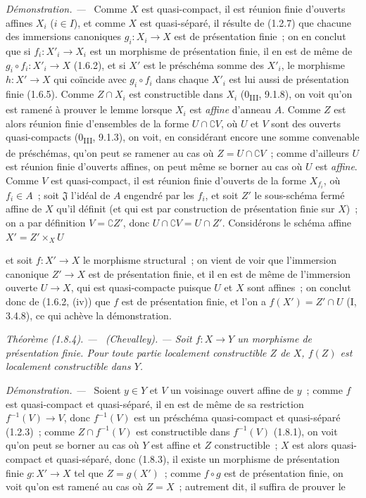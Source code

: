 \documentclass[10pt,oneside]{book}
\makeatletter
\newcommand{\setmanualcurrentlabel}[1]{\def\@currentlabel{#1}}
\newcommand{\oldpage}[2][]{%
  \setcounter{footnote}{0}%
  \marginpar{\scriptsize\textbf{#1}~|~#2}\ignorespaces}
\newenvironment{theorem}[1][]{%
  \setmanualcurrentlabel{#1}\par\medskip\noindent\itshape Théorème (#1). ---\ }{\par}
\newenvironment{proof}{%
  \par\medskip\noindent\textit{Démonstration. ---\ }}{\par}
\makeatother
\begin{document}
\begin{proof}
Comme $X$ est quasi-compact, il est réunion finie d'ouverts affines $X_i$
($i\in I$), et comme $X$ est quasi-séparé, il résulte de (1.2.7) que chacune
des immersions canoniques $g_i:X_i\to X$ est de présentation finie~; on en
conclut que si $f_i:X'_i\to X_i$ est un morphisme de présentation finie, il
en est de même de $g_i\circ f_i:X'_i\to X$ (1.6.2), et si $X'$ est le
préschéma somme des $X'_i$, le morphisme $h:X'\to X$ qui coïncide avec
$g_i\circ f_i$ dans chaque $X'_i$ est lui aussi de présentation finie
(1.6.5). Comme $Z\cap X_i$ est constructible dans $X_i$
(0\textsubscript{III}, 9.1.8), on voit qu'on est ramené à prouver le lemme
lorsque $X_i$ est \emph{affine} d'anneau $A$. Comme $Z$ est alors réunion
finie d'ensembles de la forme $U\cap\complement V$, où $U$ et $V$ sont des
ouverts quasi-compacts (0\textsubscript{III}, 9.1.3), on voit, en considérant
encore une somme convenable de préschémas, qu'on peut se ramener au cas où
$Z=U\cap\complement V$~; comme d'ailleurs $U$ est réunion finie d'ouverts
affines, on peut même se borner au cas où $U$ est \emph{affine}. Comme $V$
est quasi-compact, il est réunion finie d'ouverts de la forme $X_{f_i}$, où
$f_i\in A$~; soit $\mathfrak J$ l'idéal de $A$ engendré par les $f_i$, et
soit $Z'$ le sous-schéma fermé affine de $X$ qu'il définit (et qui est par
construction de présentation finie sur $X$)~; on a par définition
$V=\complement Z'$, donc $U\cap\complement V=U\cap Z'$. Considérons le
schéma affine $X'=Z'\times_XU$

\oldpage[IV-1]{239}

et soit $f:X'\to X$ le morphisme structural~; on vient de voir que
l'immersion canonique $Z'\to X$ est de présentation finie, et il en est de
même de l'immersion ouverte $U\to X$, qui est quasi-compacte puisque $U$ et
$X$ sont affines~; on conclut donc de (1.6.2, (iv)) que $f$ est de
présentation finie, et l'on a $f(X')=Z'\cap U$ (I, 3.4.8), ce qui achève la
démonstration.
\end{proof}

\begin{theorem}[1.8.4]
\label{IV.1.8.4-fr}
\textup{(Chevalley).} --- Soit $f:X\to Y$ un morphisme de présentation
finie. Pour toute partie localement constructible $Z$ de $X$, $f(Z)$ est
localement constructible dans $Y$.
\end{theorem}

\begin{proof}
Soient $y\in Y$ et $V$ un voisinage ouvert affine de $y$~; comme $f$ est
quasi-compact et quasi-séparé, il en est de même de sa restriction
$f^{-1}(V)\to V$, donc $f^{-1}(V)$ est un préschéma quasi-compact et
quasi-séparé (1.2.3)~; comme $Z\cap f^{-1}(V)$ est constructible dans
$f^{-1}(V)$ (1.8.1), on voit qu'on peut se borner au cas où $Y$ est affine
et $Z$ constructible~; $X$ est alors quasi-compact et quasi-séparé, donc
(1.8.3), il existe un morphisme de présentation finie $g:X'\to X$ tel que
$Z=g(X')$~; comme $f\circ g$ est de présentation finie, on voit qu'on est
ramené au cas où $Z=X$~; autrement dit, il suffira de prouver le
\end{proof}
\end{document}
